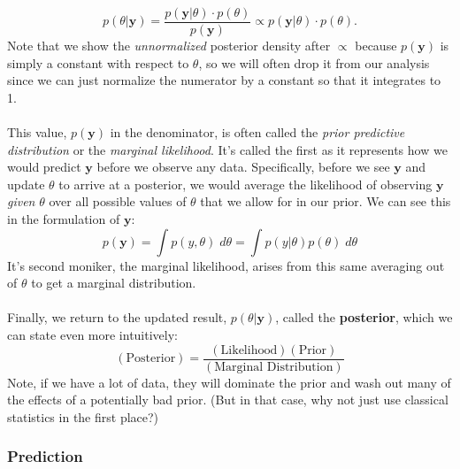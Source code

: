\documentclass[12pt]{article}
\theoremstyle{plain}
\theoremstyle{definition}
\theoremstyle{remark}
\begin{document}
\begin{equation}
   \label{bayes}
    p(\theta | \mathbf{y}) = \frac{p(\mathbf{y} | \theta) \cdot
      p(\theta)}{p(\mathbf{y})} \propto
      p(\mathbf{y} | \theta) \cdot p(\theta).
\end{equation}
Note that we show the \emph{unnormalized} posterior density after
$\propto$ because $p(\mathbf{y})$ is simply a constant with respect
to $\theta$, so we will often drop it from our analysis
since we can just normalize the numerator by a constant so
that it integrates to 1.
\\
\\
This value, $p(\mathbf{y})$ in the denominator, is often called
the \emph{prior predictive distribution} or the \emph{marginal
likelihood}.  It's called the first
as it represents how we would predict $\mathbf{y}$
before we observe any data. Specifically, before we see
$\mathbf{y}$ and update $\theta$ to arrive at a posterior,
we would average the likelihood of observing
$\mathbf{y}$ \emph{given} $\theta$ over all
possible values of $\theta$ that we allow for in our prior.
We can see this in the formulation of $\mathbf{y}$:
\begin{equation}
    \label{marglik}
    p(\mathbf{y}) = \int p(y, \theta) \; d\theta =
	\int p(y | \theta) p(\theta) \; d\theta
\end{equation}
It's second moniker,
the marginal likelihood, arises from this same averaging out
of $\theta$ to get a marginal distribution.
\\
\\
Finally,
we return to the updated result, $p(\theta | \mathbf{y})$,
called the \textbf{posterior}, which we can state  even more
intuitively:
   \[ (\text{Posterior}) =
      \frac{(\text{Likelihood})(\text{Prior})}{(\text{Marginal
      Distribution})} \]
Note, if we have a lot of data, they will dominate the prior and
wash out many of the effects of a potentially bad prior. (But in
that case, why not just use classical statistics in the first place?)

\subsubsection{Prediction}
\end{document}
